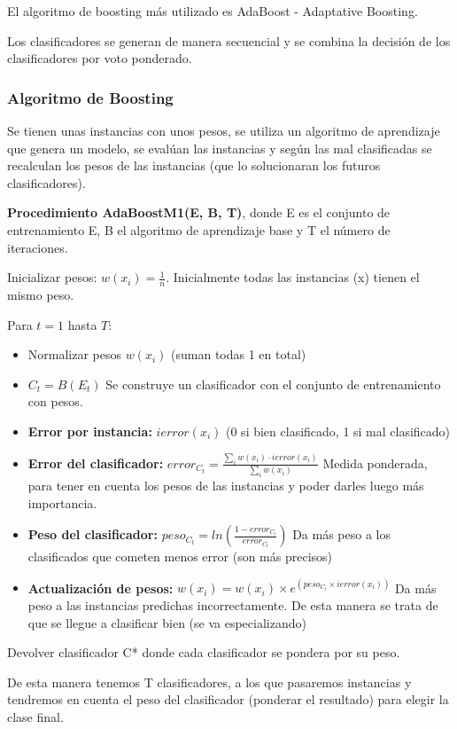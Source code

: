 \documentclass[12pt, twoside, openright]{report} %
\begin{document}
El algoritmo de boosting más utilizado es AdaBoost - Adaptative Boosting.

Los clasificadores se generan de manera secuencial y se combina la decisión de los clasificadores por voto ponderado.
\subsubsection{Algoritmo de Boosting}

Se tienen unas instancias con unos pesos, se utiliza un algoritmo de aprendizaje que genera un modelo, se evalúan las instancias y según las mal clasificadas se recalculan los pesos de las instancias (que lo solucionaran los futuros clasificadores).

\textbf{Procedimiento AdaBoostM1(E, B, T)}, donde E es el conjunto de entrenamiento E, B el algoritmo de aprendizaje base y T el número de iteraciones.

Inicializar pesos: $w(x_i) = \frac 1 n$. Inicialmente todas las instancias (x) tienen el mismo peso.

Para $t = 1$ hasta $T$:
\begin{itemize}
	\item Normalizar pesos $w(x_i)$ (suman todas 1 en total)
	\item $C_t = B(E_t)$ Se construye un clasificador con el conjunto de entrenamiento con pesos.
	\item \textbf{Error por instancia:} $ierror(x_i)$ (0 si bien clasificado, 1 si mal clasificado)
	\item \textbf{Error del clasificador:} $error_{C_t} = \frac {\sum_i w(x_i)\cdot ierror(x_i)} {\sum_i w(x_i)}$ Medida ponderada, para tener en cuenta los pesos de las instancias y poder darles luego más importancia.
	\item \textbf{Peso del clasificador:} $peso_{C_t} = ln \left( \frac{1-error_{C_t}}{error_{C_t}} \right)$ Da más peso a los clasificados que cometen menos error (son más precisos)
	\item \textbf{Actualización de pesos:} $w(x_i) = w(x_i) \times e^{(peso_{C_t} \times ierror(x_i))}$ Da más peso a las instancias predichas incorrectamente. De esta manera se trata de que se llegue a clasificar bien (se va especializando)
\end{itemize}
Devolver clasificador C* donde cada clasificador se pondera por su peso.

De esta manera tenemos T clasificadores, a los que pasaremos instancias y tendremos en cuenta el peso del clasificador (ponderar el resultado) para elegir la clase final.
\end{document}
